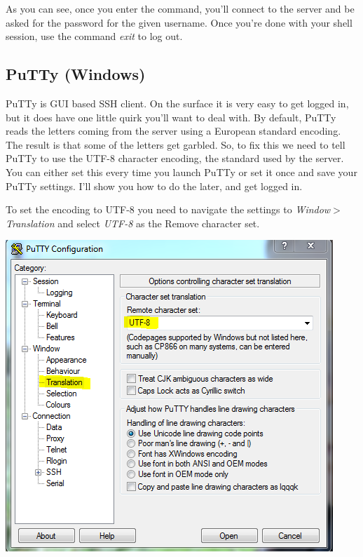 \documentclass[nobib]{tufte-handout}
\begin{document}
As you can see, once you enter the command, you'll connect to the server and be asked for the password for the given username. Once you're done with your shell session, use the command \textit{exit} to log out.

\subsection{PuTTy (Windows)}

PuTTy is  GUI based SSH client.  On the surface it is very easy to get logged in, but it does have one little quirk you'll want to deal with. By default, PuTTy reads the letters coming from the server using a European standard encoding.  The result is that some of the letters get garbled. So, to fix this we need to tell PuTTy to use the UTF-8 character encoding, the standard used by the server.  You can either set this every time you launch PuTTy or set it once and save your PuTTy settings. I'll show you how to do the later, and get logged in.

To set the encoding to UTF-8 you need to navigate the settings to \textit{Window$>$Translation} and select \textit{UTF-8} as the Remove character set.

\vspace{.1in}
\begin{center}
\includegraphics[scale=.75]{Putty-SetUTF8.png}
\end{center}
\vspace{.1in}
\end{document}
